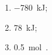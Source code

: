   \begin{solution}
    \begin{enumerate}
      \item \SI{-780}{\kilo\joule};
      \item \SI{78}{\kilo\joule};
      \item \SI{0.5}{\mole{}}.
    \end{enumerate}
  \end{solution}
